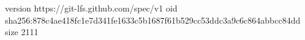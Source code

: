 version https://git-lfs.github.com/spec/v1
oid sha256:878c4ae418fc1e7d341fe1633c5b1687f61b529cc53ddc3a9c6c864abbcc84dd
size 2111
